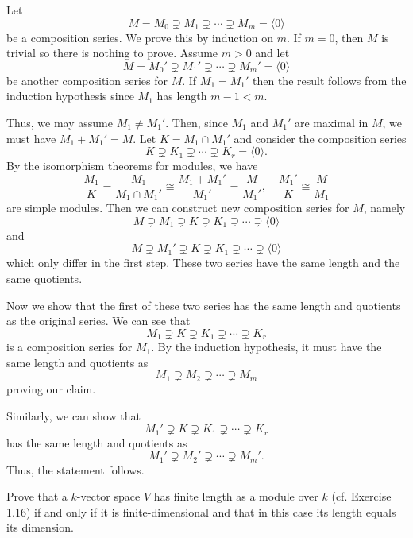 \documentclass[../../master.tex]{subfiles}
\begin{document}
\begin{solution}
    Let
    \[
        M = M_0 \supsetneq M_1 \supsetneq \cdots \supsetneq M_m = \langle 0 \rangle
    \]
    be a composition series.
    We prove this by induction on $m$.
    If $m = 0$, then $M$ is trivial so there is nothing to prove.
    Assume $m > 0$ and let 
    \[
        M = M_0' \supsetneq M_1' \supsetneq \cdots \supsetneq M_m' = \langle 0 \rangle
    \]
    be another composition series for $M$.
    If $M_1 = M_1'$ then the result follows from the induction hypothesis since $M_1$ has length $m - 1 < m$.

    Thus, we may assume $M_1 \neq M_1'$.
    Then, since $M_1$ and $M_1'$ are maximal in $M$, we must have $M_1 + M_1' = M$.
    Let $K = M_1 \cap M_1'$ and consider the composition series
    \[
        K \supsetneq K_1 \supsetneq \cdots \supsetneq K_r = \langle 0 \rangle.
    \]
    By the isomorphism theorems for modules, we have
    \[
    \frac{M_1}{K} = \frac{M_1}{M_1 \cap M_1'} \cong \frac{M_1 + M_1'}{M_1'} = \frac{M}{M_1'}, \quad \frac{M_1'}{K} \cong \frac{M}{M_1}
    \]
    are simple modules.
    Then we can construct new composition series for $M$, namely
    \[
        M \supsetneq M_1 \supsetneq K \supsetneq K_1 \supsetneq \cdots \supsetneq \langle 0 \rangle
    \]
    and
    \[
        M \supsetneq M_1' \supsetneq K \supsetneq K_1 \supsetneq \cdots \supsetneq \langle 0 \rangle
    \]
    which only differ in the first step.
    These two series have the same length and the same quotients.

    Now we show that the first of these two series has the same length and quotients as the original series.
    We can see that
    \[
    M_1 \supsetneq K \supsetneq K_1 \supsetneq \cdots \supsetneq K_r
    \]
    is a composition series for $M_1$.
    By the induction hypothesis, it must have the same length and quotients as
    \[
    M_1 \supsetneq M_2 \supsetneq \cdots \supsetneq M_m
    \]
    proving our claim.

    Similarly, we can show that
    \[
    M_1' \supsetneq K \supsetneq K_1 \supsetneq \cdots \supsetneq K_r
    \]
    has the same length and quotients as
    \[
    M_1' \supsetneq M_2' \supsetneq \cdots \supsetneq M_m'.
    \]
    Thus, the statement follows.
\end{solution}

\begin{problem}
    Prove that a $k$-vector space $V$ has finite length as a module over $k$ (cf. Exercise 1.16) if and only if it is finite-dimensional and that in this case its length equals its dimension.
\end{problem}
\end{document}
